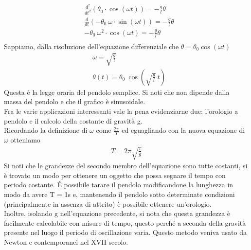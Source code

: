 \documentclass[10pt,a4paper]{article}
\begin{document}
\begin{align*}
&\frac{d^2}{dt^2} (\theta_0 \cdot \cos(\omega t)) = -\frac{g}{l} \theta\\
&\frac{d}{dt} (-\theta_0\ \omega \cdot \sin(\omega t)) = -\frac{g}{l} \theta\\
&-\theta_0\ \omega^2 \cdot \cos(\omega t) = -\frac{g}{l} \theta\\
\end{align*}
Sappiamo, dalla risoluzione dell'equazione differenziale che $\theta = \theta_0 \cos(\omega t)$
\begin{align*}
	&\omega = \sqrt{\frac{g}{l}}\\
	&\theta(t) = \theta_0\ \cos(\sqrt{\frac{g}{l}}\ t)
\end{align*}
Questa è la legge oraria del pendolo semplice. Si noti che non dipende dalla massa del pendolo e che il grafico è sinusoidale.\\ Fra le varie applicazioni interessanti vale la pena evidenziarne due: l'orologio a pendolo e il calcolo della costante di gravità g.\\
Ricordando la definizione di $\omega$ come $\frac{2 \pi}{T}$ ed eguagliando con la nuova equazione di $\omega$ otteniamo
\begin{align*}
T = 2\pi \sqrt{\frac{l}{g}}
\end{align*}
Si noti che le grandezze del secondo membro dell'equazione sono tutte costanti, si è trovato un modo per ottenere un oggetto che possa segnare il tempo con periodo costante. \'{E} possibile tarare il pendolo modificandone la lunghezza in modo da avere T = 1s e, mantenendo il pendolo sotto determinate condizioni (principalmente in assenza di attrito) è possibile ottenere un'orologio.\\
Inoltre, isolando g nell'equazione precedente, si nota che questa grandezza è facilmente calcolabile con misure di tempo, questo perché a seconda della gravità presente nel luogo il periodo di oscillazione varia. Questo metodo veniva usato da Newton e contemporanei nel XVII secolo.
\end{document}
